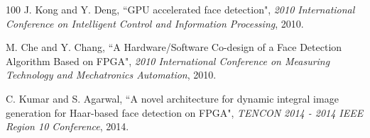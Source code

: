\documentclass[conference]{IEEEtran}
\begin{document}
\begin {thebibliography}{100}
J. Kong and Y. Deng, ``GPU accelerated face detection", \emph{2010 International Conference on Intelligent Control and Information Processing}, 2010.

M. Che and Y. Chang, ``A Hardware/Software Co-design of a Face Detection Algorithm Based on FPGA", \emph{2010 International Conference on Measuring Technology and Mechatronics Automation}, 2010.

C. Kumar and S. Agarwal, ``A novel architecture for dynamic integral image generation for Haar-based face detection on FPGA", \emph{TENCON 2014 - 2014 IEEE Region 10 Conference}, 2014.

\end {thebibliography}

\end{document}
